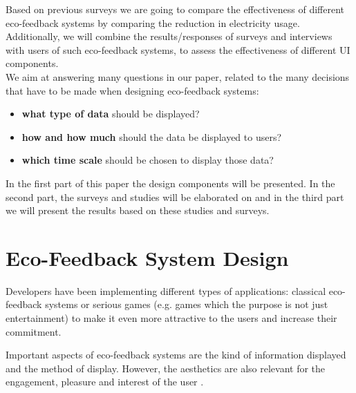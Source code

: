 \documentclass[journal]{vgtc}                %
\begin{document}
Based on previous surveys we are going to compare the effectiveness of different eco-feedback systems by comparing the reduction in electricity usage. Additionally, we will combine the results/responses of surveys and interviews with users of such eco-feedback systems, to assess the effectiveness of different UI components. \\

We aim at answering many questions in our paper, related to the many decisions that have to be made when designing eco-feedback systems:
\begin{itemize}
\item \textbf{what type of data} should be displayed? 
\item \textbf{how and how much} should the data be displayed to users? 
\item \textbf{which time scale} should be chosen to display those data? 
\end{itemize}

In the first part of this paper the design components will be presented. In the second part, the surveys and studies will be elaborated on and in the third part we will present the results based on these studies and surveys. %


\section{Eco-Feedback System Design}
Developers have been implementing different types of applications: classical eco-feedback systems or serious games (e.g. games which the purpose is not just entertainment) %
to make it even more attractive to the users and increase their commitment.

Important aspects of eco-feedback systems are the kind of information displayed and the method of display. However, the aesthetics are also relevant for the engagement, pleasure and interest of the user \cite{bartram2015design}.
\end{document}
